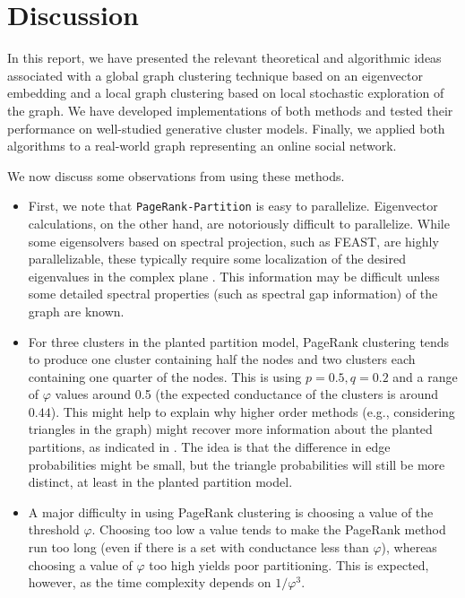 \documentclass[11pt]{article}
\begin{document}
\section{Discussion}
\label{Discussion}

In this report, we have presented the relevant theoretical and algorithmic ideas associated with a global graph clustering technique based on an eigenvector embedding and a local graph clustering based on local stochastic exploration of the graph. We have developed implementations of both methods and tested their performance on well-studied generative cluster models. Finally, we applied both algorithms to a real-world graph representing an online social network.

We now discuss some observations from using these methods.
\begin{itemize}
\item First, we note that {\tt PageRank-Partition} is easy to parallelize. Eigenvector calculations, on the other hand, are notoriously difficult to parallelize. While some eigensolvers based on spectral projection, such as FEAST, are highly parallelizable, these typically require some localization of the desired eigenvalues in the complex plane \cite{FEAST}. This information may be difficult unless some detailed spectral properties (such as spectral gap information) of the graph are known.

\item For three clusters in the planted partition model, PageRank clustering tends to produce one cluster containing half the nodes and two clusters each containing one quarter of the nodes. This is using $p=0.5,q=0.2$ and a range of $\varphi$ values around 0.5 (the expected conductance of the clusters is around $0.44$). This might help to explain why higher order methods (e.g., considering triangles in the graph) might recover more information about the planted partitions, as indicated in \cite{benson}. The idea is that the difference in edge probabilities might be small, but the triangle probabilities will still be more distinct, at least in the planted partition model.

\item A major difficulty in using PageRank clustering is choosing a value of the threshold $\varphi$. Choosing too low a value tends to make the PageRank method run too long (even if there is a set with conductance less than $\varphi$), whereas choosing a value of $\varphi$ too high yields poor partitioning. This is expected, however, as the time complexity depends on $1/\varphi^3$.


\end{itemize}
\end{document}
